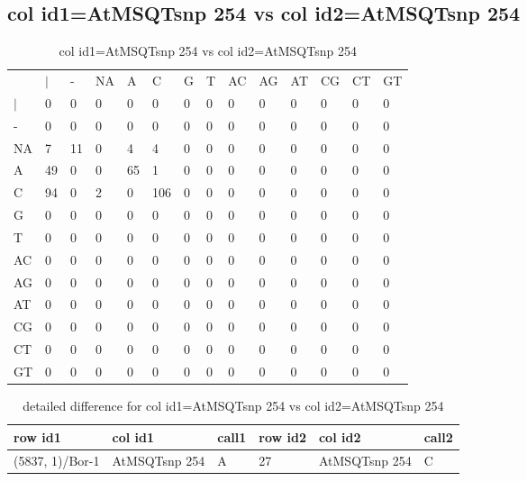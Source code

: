 \subsection{col id1=AtMSQTsnp 254 vs col id2=AtMSQTsnp 254}
\begin{center}
\begin{longtable}{|l|l|l|l|l|l|l|l|l|l|l|l|l|l|}
\caption{col id1=AtMSQTsnp 254 vs col id2=AtMSQTsnp 254} \label{table_dm804}\\
\hline
\\
\hline
&$|$&-&NA&A&C&G&T&AC&AG&AT&CG&CT&GT\\
$|$&0&0&0&0&0&0&0&0&0&0&0&0&0\\
-&0&0&0&0&0&0&0&0&0&0&0&0&0\\
NA&7&11&0&4&4&0&0&0&0&0&0&0&0\\
A&49&0&0&65&1&0&0&0&0&0&0&0&0\\
C&94&0&2&0&106&0&0&0&0&0&0&0&0\\
G&0&0&0&0&0&0&0&0&0&0&0&0&0\\
T&0&0&0&0&0&0&0&0&0&0&0&0&0\\
AC&0&0&0&0&0&0&0&0&0&0&0&0&0\\
AG&0&0&0&0&0&0&0&0&0&0&0&0&0\\
AT&0&0&0&0&0&0&0&0&0&0&0&0&0\\
CG&0&0&0&0&0&0&0&0&0&0&0&0&0\\
CT&0&0&0&0&0&0&0&0&0&0&0&0&0\\
GT&0&0&0&0&0&0&0&0&0&0&0&0&0\\
\hline
\end{longtable}
\end{center}

\begin{center}
\begin{longtable}{|l|l|l|l|l|l|}
\caption{detailed difference for col id1=AtMSQTsnp 254 vs col id2=AtMSQTsnp 254} \label{table_dm805}\\
\hline
row id1&col id1&call1&row id2&col id2&call2\\
\hline
(5837, 1)/Bor-1&AtMSQTsnp 254&A&27&AtMSQTsnp 254&C\\
\hline
\end{longtable}
\end{center}

